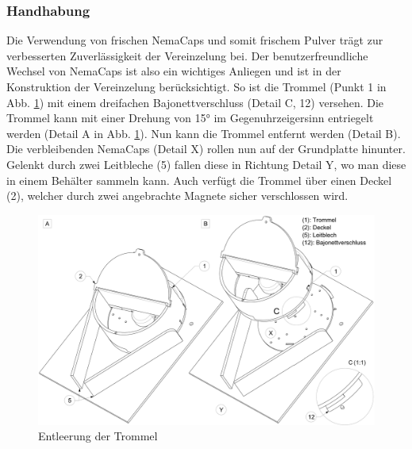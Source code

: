 \subsubsection{Handhabung}
Die Verwendung von frischen NemaCaps und somit frischem Pulver trägt zur verbesserten Zuverlässigkeit der Vereinzelung bei. Der benutzerfreundliche Wechsel von NemaCaps ist also ein wichtiges Anliegen und ist in der Konstruktion der Vereinzelung berücksichtigt. So ist die Trommel (Punkt 1 in Abb. \ref{fig:vereinzelung_entleeren}) mit einem dreifachen Bajonettverschluss (Detail C, 12) versehen. Die Trommel kann mit einer Drehung von 15° im Gegenuhrzeigersinn entriegelt werden (Detail A in Abb. \ref{fig:vereinzelung_entleeren}). Nun kann die Trommel entfernt werden (Detail B). Die verbleibenden NemaCaps (Detail X) rollen nun auf der Grundplatte hinunter. Gelenkt durch zwei Leitbleche (5) fallen diese in Richtung Detail Y, wo man diese in einem Behälter sammeln kann. Auch verfügt die Trommel über einen Deckel (2), welcher durch zwei angebrachte Magnete sicher verschlossen wird.
	\begin{figure}[H]
	\includegraphics[scale=0.42]{Illustrationen/6-Umsetzung/vereinzelung_entleeren.jpg}
	\caption{Entleerung der Trommel}
	\label{fig:vereinzelung_entleeren}
	\end{figure}
